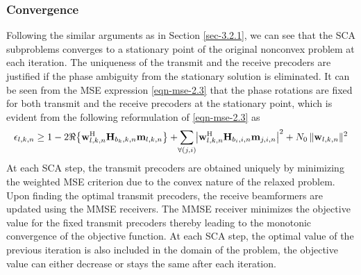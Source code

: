 \subsubsection*{Convergence}
Following the similar arguments as in  Section \ref{sec-3.2.1}, we can see that the \ac{SCA} subproblems converges to a stationary point of the original nonconvex problem at each iteration. The uniqueness of the transmit and the receive precoders are justified if the phase ambiguity from the stationary solution is eliminated. It can be seen from the \ac{MSE} expression \eqref{eqn-mse-2.3} that the phase rotations are fixed for both transmit and the receive precoders at the stationary point, which is evident from the following reformulation of \eqref{eqn-mse-2.3} as
\begin{equation}
\epsilon_{l,k,n} \geq  1 - 2 \Re{ \left \lbrace \mvec{w}{l,k,n}^\herm \mvec{H}{b_k,k,n} \mvec{m}{l,k,n} \right \rbrace} + \sum_{\mathclap{\forall (j,i)}} \left | \mvec{w}{l,k,n}^\herm \mvec{H}{b_i,i,n} \mvec{m}{j,i,n} \right |^2 + N_0 \, \|\mvec{w}{l,k,n}\|^2
\end{equation}
At each \ac{SCA} step, the transmit precoders are obtained uniquely by minimizing the weighted \ac{MSE} criterion due to the convex nature of the relaxed problem. Upon finding the optimal transmit precoders, the receive beamformers are updated using the \ac{MMSE} receivers. The \ac{MMSE} receiver minimizes the objective value for the fixed transmit precoders thereby leading to the monotonic convergence of the objective function. At each \ac{SCA} step, the optimal value of the previous iteration is also included in the domain of the problem, the objective value can either decrease or stays the same after each iteration.
